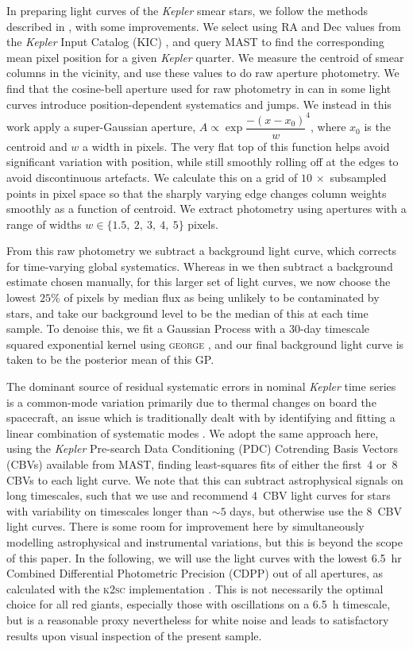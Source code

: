 \documentclass[a4paper,fleqn,usenatbib]{mnras}
\newcommand{\kepler}{\emph{Kepler}\xspace}
\begin{document}
In preparing light curves of the \kepler smear stars, we follow the methods described in \citet{smear}, with some improvements. We select using RA and Dec values from the \kepler Input Catalog (KIC) \citep{kic}, and query MAST to find the corresponding mean pixel position for a given \kepler quarter. We measure the centroid of smear columns in the vicinity, and use these values to do raw aperture photometry. We find that the cosine-bell aperture used for raw photometry in \citet{smear} can in some light curves introduce position-dependent systematics and jumps. We instead in this work apply a super-Gaussian aperture, $A \propto \exp{\dfrac{-(x-x_0)}{w} ^ 4}$, where $x_0$ is the centroid and $w$ a width in pixels. The very flat top of this function helps avoid significant variation with position, while still smoothly rolling off at the edges to avoid discontinuous artefacts. We calculate this on a grid of $10\,\times$ subsampled points in pixel space so that the sharply varying edge changes column weights smoothly as a function of centroid. We extract photometry using apertures with a range of widths $w \in\{1.5,~2,~3,~4,~5\}$ pixels.

From this raw photometry we subtract a background light curve, which corrects for time-varying global systematics. Whereas in \citet{smear} we then subtract a background estimate chosen manually, for this larger set of light curves, we now choose the lowest $25\%$ of pixels by median flux as being unlikely to be contaminated by stars, and take our background level to be the median of this at each time sample. To denoise this, we fit a Gaussian Process with a 30-day timescale squared exponential kernel using \textsc{george} \citep{hodlr}, and our final background light curve is taken to be the posterior mean of this GP. 

The dominant source of residual systematic errors in nominal \kepler time series is a common-mode variation primarily due to thermal changes on board the spacecraft, an issue which is traditionally dealt with by identifying and fitting a linear combination of systematic modes \citep{pdc0,pdc1,pdc2,petigura}. We adopt the same approach here, using the \kepler Pre-search Data Conditioning (PDC) Cotrending Basis Vectors (CBVs) available from MAST, finding least-squares fits of  either the first~4 or~8 CBVs to each light curve. We note that this can subtract astrophysical signals on long timescales, such that we use and recommend 4~CBV light curves for stars with variability on timescales longer than $\sim 5$ days, but otherwise use the 8~CBV light curves. There is some room for improvement here by simultaneously modelling astrophysical and instrumental variations, but this is beyond the scope of this paper. In the following, we will use the light curves with the lowest 6.5~hr Combined Differential Photometric Precision (CDPP) \citep{cdpp} out of all apertures, as calculated with the \textsc{k2sc} implementation \citep{k2sc}. This is not necessarily the optimal choice for all red giants, especially those with oscillations on a 6.5~h timescale, but is a reasonable proxy nevertheless for white noise and leads to satisfactory results upon visual inspection of the present sample.
\end{document}
